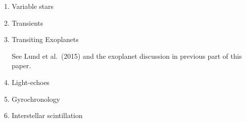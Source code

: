 \begin{enumerate}

\item Variable stars




\item Transients

\item Transiting Exoplanets

See Lund et al.\ (2015) and the exoplanet discussion in previous part
of this paper.



\item Light-echoes

\item Gyrochronology

\item Interstellar scintillation


\end{enumerate}

